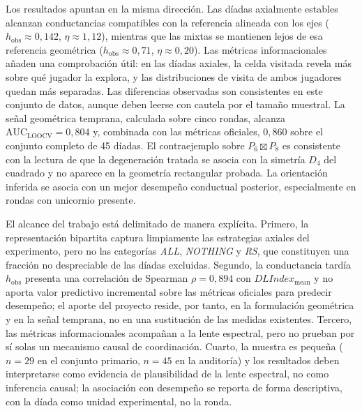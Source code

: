 \documentclass[journal]{IEEEtran}
\begin{document}
Los resultados apuntan en la misma dirección. Las díadas axialmente estables alcanzan conductancias compatibles con la referencia alineada con los ejes ($h_{\mathrm{obs}} \approx 0{,}142$, $\eta \approx 1{,}12$), mientras que las mixtas se mantienen lejos de esa referencia geométrica ($h_{\mathrm{obs}} \approx 0{,}71$, $\eta \approx 0{,}20$). Las métricas informacionales añaden una comprobación útil: en las díadas axiales, la celda visitada revela más sobre qué jugador la explora, y las distribuciones de visita de ambos jugadores quedan más separadas. Las diferencias observadas son consistentes en este conjunto de datos, aunque deben leerse con cautela por el tamaño muestral. La señal geométrica temprana, calculada sobre cinco rondas, alcanza $\mathrm{AUC}_{\mathrm{LOOCV}} = 0{,}804$ y, combinada con las métricas oficiales, $0{,}860$ sobre el conjunto completo de 45 díadas. El contraejemplo sobre $P_6 \boxtimes P_8$ es consistente con la lectura de que la degeneración tratada se asocia con la simetría $D_4$ del cuadrado y no aparece en la geometría rectangular probada. La orientación inferida se asocia con un mejor desempeño conductual posterior, especialmente en rondas con unicornio presente.

El alcance del trabajo está delimitado de manera explícita. Primero, la representación bipartita captura limpiamente las estrategias axiales del experimento, pero no las categorías \emph{ALL}, \emph{NOTHING} y \emph{RS}, que constituyen una fracción no despreciable de las díadas excluidas. Segundo, la conductancia tardía $h_{\mathrm{obs}}$ presenta una correlación de Spearman $\rho = 0{,}894$ con $DLIndex_{\mathrm{mean}}$ y no aporta valor predictivo incremental sobre las métricas oficiales para predecir desempeño; el aporte del proyecto reside, por tanto, en la formulación geométrica y en la señal temprana, no en una sustitución de las medidas existentes. Tercero, las métricas informacionales acompañan a la lente espectral, pero no prueban por sí solas un mecanismo causal de coordinación. Cuarto, la muestra es pequeña ($n=29$ en el conjunto primario, $n=45$ en la auditoría) y los resultados deben interpretarse como evidencia de plausibilidad de la lente espectral, no como inferencia causal; la asociación con desempeño se reporta de forma descriptiva, con la díada como unidad experimental, no la ronda.
\end{document}
